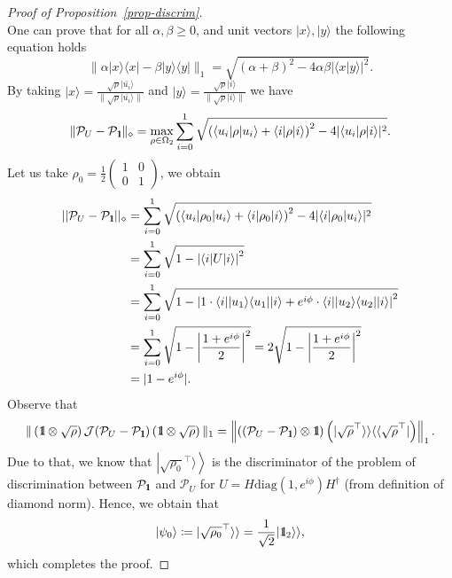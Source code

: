 \documentclass[preprint,12pt, a4paper]{elsarticle}
\newcommand{\ket}[1]{\ensuremath{|#1\rangle}}
\newcommand{\bra}[1]{\ensuremath{\langle#1|}}
\newcommand{\ketbra}[2]{\ensuremath{\ket{#1}\bra{#2}}}
\newcommand{\proj}[1]{\ensuremath{\ketbra{#1}{#1}}}
\newcommand{\braket}[2]{\ensuremath{\langle{#1}|{#2}\rangle}}
\newcommand{\1}{{\rm 1\hspace{-0.9mm}l}}
\newcommand{\Id}{{\rm 1\hspace{-0.9mm}l}}
\newcommand{\PP}{\mathcal{P}}
\newcommand{\diag}{\mathrm{diag}}
\begin{document}
\begin{proof}[Proof of Proposition~\ref{prop-discrim}]
\begin{equation}
	\end{equation}
	One can prove that for all $\alpha, \beta \ge 0 $, and unit vectors $\ket{x}, 
	\ket{y}$ the following equation holds~\cite{watrous} 
	\begin{equation}
	\| \alpha \proj{x} - \beta\proj{y} \|_1 = \sqrt{(\alpha + \beta)^2 - 4\alpha 
		\beta |\braket{x}{y}|^2}.
	\end{equation}
	By taking $\ket{x} = \frac{\sqrt{\rho} \ket{\bar{u_i}}}{\| \sqrt{\rho} 
		\ket{\bar{u_i}} \|}$ and $ \ket{y} = \frac{\sqrt{\rho} \ket{i}}{\|\sqrt{\rho} 
		\ket{i} \|}$ we have
	\begin{equation}
	\| \PP_{U} - \PP_{\Id}  \|_\diamond  = \max_{\rho \in \Omega_2} 
	\sum_{i=0}^{1} \sqrt{\left( \bra{u_i} \rho \ket{u_i} + \bra{i} \rho \ket{i 
		}\right)^2 - 4 | \bra{u_i} \rho \ket{i} |^2}.
	\end{equation}
	Let us take  $\rho_0 =   \frac{1}{2}  	
	\left(\begin{array}{cc}1&0\\0&1\end{array}\right)  $,   we obtain
	\begin{equation}
	\begin{split}
	||\mathcal{P}_U - \mathcal{P}_{\1}||_\diamond 
	&= \sum_{i=0}^1  
	\sqrt{\left(\bra{u_i}\rho_0\ket{u_i} + \bra{i} \rho_0 \ket{i} \right)^2 - 
		4|\bra{i}\rho_0\ket{u_i}|^2}  \\
	&= \sum_{i=0}^1  \sqrt{ 1 -  \left| \bra{i}  U \ket{i }\right|^2} 
	\\ 
	&=\sum_{i=0}^1  \sqrt{1 -  \left| 1 \cdot \bra{i} \proj{u_1} 
		\ket{i} + e^{i \phi} \cdot\bra{i}  \proj{u_2}\ket{i}\right|^2} \\
	&= \sum_{i=0}^1 
	\sqrt{1 -\left| \frac{1+ e^{i \phi}}{2}\right|^2 } 
	= 2 \sqrt{1 -\left| \frac{1+e^{i \phi}}{2}\right|^2 } \\
	&= |1-e^{i \phi }|.
	\end{split}
	\end{equation}
	Observe that
	\begin{equation}
	\begin{split}
 \| \left( \Id \otimes \sqrt{\rho} \right) \mathcal{J}(\PP_{U} - \PP_{\Id} )  \left( 
	\Id \otimes \sqrt{\rho} \right) \|_1 = \left\| ( (\PP_{U} - \PP_\Id) \otimes \Id) \left(  | \sqrt{\rho}^\top 
	\rangle \rangle \langle \langle \sqrt{\rho}^\top | \right) \right\|_1.
	\end{split}
	\end{equation}
	Due to that, we know  
	that $\left| \sqrt{\rho_0}^{\top} \rangle \right\rangle$ is the discriminator of the problem 
	of discrimination between 
	$\PP_{\Id} $ and $\PP_U$ for 
	$ U =  H \diag(1, e^{i \phi}) H^\dagger$ (from definition of diamond norm).      Hence, we obtain that \begin{equation}
	\ket{\psi_{0}} \coloneqq   | \sqrt{\rho_0}^\top \rangle \rangle = \frac{1}{\sqrt{2} } | 
	\Id_2 \rangle \rangle,
	\end{equation}
	which completes the proof.
\end{proof}
\end{document}
